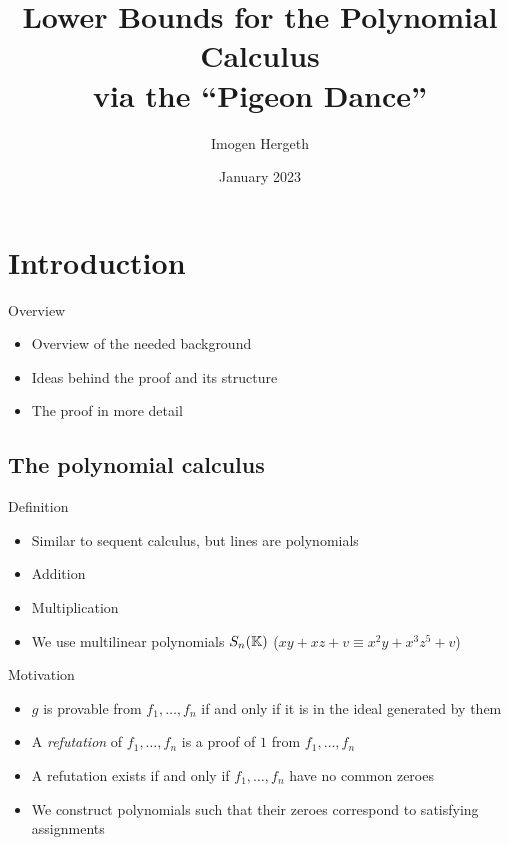 \documentclass[xcolor={dvipsnames}]{beamer}
\title{Lower Bounds for the Polynomial Calculus\\via the ``Pigeon Dance''}
\author{Imogen Hergeth}
\date{January 2023}
\newcommand{\Sn}{S_n(\KK)}
\begin{document}
\maketitle

\section{Introduction}
\begin{frame}{Overview}
    \begin{itemize}[<+->]
        \item Overview of the needed background
        \item Ideas behind the proof and its structure
        \item The proof in more detail
    \end{itemize}
\end{frame}

\subsection{The polynomial calculus}
\begin{frame}{Definition}
    \begin{itemize}[<+->]
        \item Similar to sequent calculus, but lines are polynomials
        \item Addition
        \begin{prooftree}
        \end{prooftree}
        \item Multiplication
        \begin{prooftree}
        \end{prooftree}
        \item We use multilinear polynomials $\Sn$ ($xy + xz + v \equiv x^2y + x^3z^5 + v$)
    \end{itemize}
\end{frame}

\begin{frame}{Motivation}
    \begin{itemize}[<+->]
        \item $g$ is provable from $f_1, \ldots, f_n$ if and only if it is in the ideal generated by them
        \item A \textit{refutation} of $f_1, \ldots, f_n$ is a proof of $1$ from $f_1, \ldots, f_n$
        \item A refutation exists if and only if $f_1, \ldots, f_n$ have no common zeroes
        \item We construct polynomials such that their zeroes correspond to satisfying assignments
    \end{itemize}
\end{frame}
\end{document}
